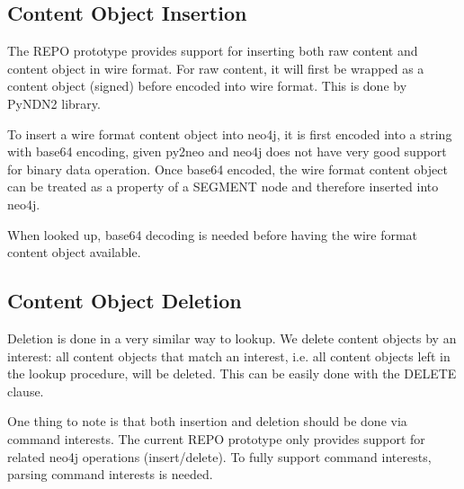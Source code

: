 \subsection{Content Object Insertion}

The REPO prototype provides support for inserting both raw content and content object in wire format. For raw content, it will first be wrapped as a content object (signed) before encoded into wire format. This is done by PyNDN2 library.

To insert a wire format content object into neo4j, it is first encoded into a string with base64 encoding, given py2neo and neo4j does not have very good support for binary data operation. Once base64 encoded, the wire format content object can be treated as a property of a SEGMENT node and therefore inserted into neo4j.

When looked up, base64 decoding is needed before having the wire format content object available.

\subsection{Content Object Deletion}

Deletion is done in a very similar way to lookup. We delete content objects by an interest: all content objects that match an interest, i.e. all content objects left in the lookup procedure, will be deleted. This can be easily done with the DELETE clause.

One thing to note is that both insertion and deletion should be done via command interests. The current REPO prototype only provides support for related neo4j operations (insert/delete). To fully support command interests, parsing command interests is needed.
